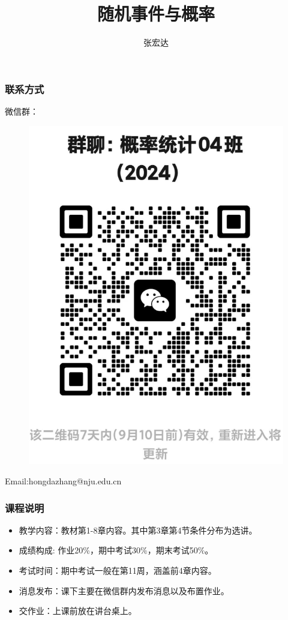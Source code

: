 \documentclass{beamer}
\title[]{随机事件与概率}
\author[概率统计]{张宏达}
\institute{Nanjing University}
\date{}
\begin{document}
	\begin{frame}
		\titlepage
	\end{frame}
	\begin{frame}
		\frametitle{联系方式}
		微信群：
		\begin{figure}[H]
			\centering
			\includegraphics[scale=0.13]{figures/概率统计04.png}
		\end{figure}
	Email:hongdazhang@nju.edu.cn
	\end{frame}
	
	\begin{frame}
		\frametitle{课程说明}
		\begin{itemize}
			\item 教学内容：教材第1-8章内容。其中第3章第4节条件分布为选讲。
			\item 成绩构成: 作业20\%，期中考试30\%，期末考试50\%。
			\item 考试时间：期中考试一般在第11周，涵盖前4章内容。
			\item 消息发布：课下主要在微信群内发布消息以及布置作业。
			\item 交作业：上课前放在讲台桌上。
		\end{itemize}
	\end{frame}
	
\end{document}
